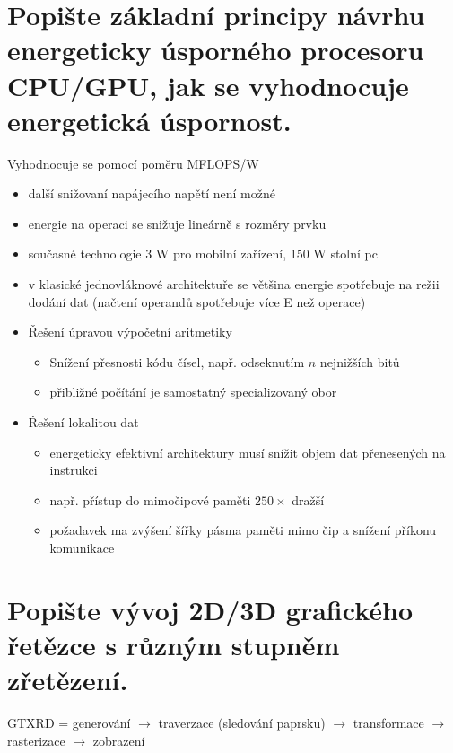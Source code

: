 




\newcommand\courseShortcut{GMU}
\newcommand\courseName{Grafické a multimediální procesory}
\newcommand\projectName{Příprava na zkoušku}




	


\section{Popište základní principy návrhu energeticky úsporného procesoru CPU/GPU, jak se vyhodnocuje energetická úspornost.}
	Vyhodnocuje se pomocí poměru MFLOPS/W
	
	\begin{itemize}
		\setlength\itemsep{0em}
		\item další snižovaní napájecího napětí není možné
		\item energie na operaci se snižuje lineárně s rozměry prvku
		\item současné technologie 3 W pro mobilní zařízení, 150 W stolní pc
		\item v klasické jednovláknové architektuře se většina energie spotřebuje na režii dodání dat (načtení operandů spotřebuje více E než operace)
		\item Řešení úpravou výpočetní aritmetiky
			\begin{itemize}
				\setlength\itemsep{0em}
				\item Snížení přesnosti kódu čísel, např. odseknutím $n$ nejnižších bitů
				\item přibližné počítání je samostatný specializovaný obor
			\end{itemize}			
		\item Řešení lokalitou dat
			\begin{itemize}
				\setlength\itemsep{0em}
				\item energeticky efektivní architektury musí snížit objem dat přenesených na instrukci
				\item např. přístup do mimočipové paměti $250\times$ dražší
				\item požadavek ma zvýšení šířky pásma paměti mimo čip a snížení příkonu komunikace
			\end{itemize}	
	\end{itemize}
	

\section{Popište vývoj 2D/3D grafického řetězce s různým stupněm zřetězení.}
	GTXRD = generování $\rightarrow$ traverzace (sledování paprsku) $\rightarrow$ transformace $\rightarrow$ rasterizace $\rightarrow$ zobrazení
	
